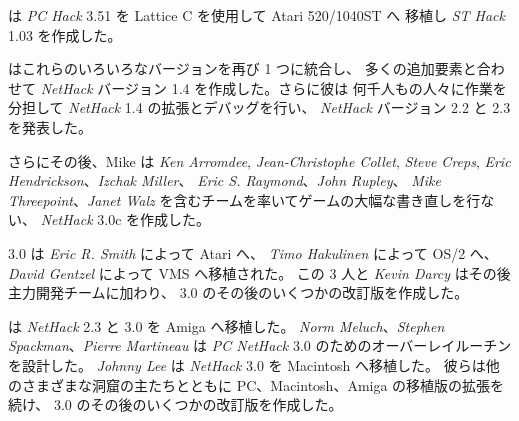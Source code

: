 \medskip
 は {\it PC Hack\/} 3.51 を Lattice C を使用して Atari 520/1040ST へ
移植し {\it ST Hack\/} 1.03 を作成した。

\medskip
 はこれらのいろいろなバージョンを再び 1 つに統合し、
多くの追加要素と合わせて {\it NetHack\/} バージョン 1.4 を作成した。さらに彼は
何千人もの人々に作業を分担して {\it NetHack\/} 1.4 の拡張とデバッグを行い、
{\it NetHack\/} バージョン 2.2 と 2.3 を発表した。

\medskip
\nd さらにその後、Mike は {\it Ken Arromdee}, {\it Jean-Christophe Collet},
{\it Steve Creps}, {\it Eric Hendrickson}、{\it Izchak Miller}、
{\it Eric S. Raymond}、{\it John Rupley}、
{\it Mike Threepoint}、{\it Janet Walz}
を含むチームを率いてゲームの大幅な書き直しを行ない、
{\it NetHack\/} 3.0c を作成した。

\medskip
 3.0 は {\it Eric R. Smith} によって Atari へ、
{\it Timo Hakulinen} によって OS/2 へ、
{\it David Gentzel} によって VMS へ移植された。
この 3 人と {\it Kevin Darcy\/} はその後主力開発チームに加わり、
3.0 のその後のいくつかの改訂版を作成した。

\medskip
 は {\it NetHack\/} 2.3 と 3.0 を Amiga へ移植した。
{\it Norm Meluch}、{\it Stephen Spackman\/}、{\it Pierre Martineau\/} は
{\it PC NetHack\/} 3.0 のためのオーバーレイルーチンを設計した。
{\it Johnny Lee\/} は {\it NetHack\/} 3.0 を Macintosh へ移植した。
彼らは他のさまざまな洞窟の主たちとともに PC、Macintosh、Amiga
の移植版の拡張を続け、 3.0 のその後のいくつかの改訂版を作成した。

